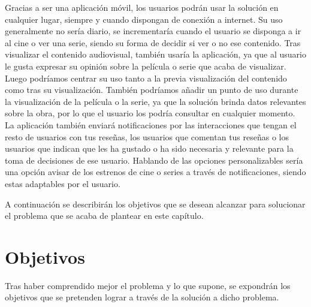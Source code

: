 Gracias a ser una aplicación móvil, los usuarios podrán usar la solución en cualquier lugar, siempre y 
cuando dispongan de conexión a internet. Su uso generalmente no sería diario, se incrementaría cuando 
el usuario se disponga a ir al cine o ver una serie, siendo su forma de decidir si ver o no ese 
contenido. Tras visualizar el contenido audiovisual, también usaría la aplicación, ya que al usuario le 
gusta expresar su opinión sobre la película o serie que acaba de visualizar. Luego podríamos centrar su 
uso tanto a la previa visualización del contenido como tras su visualización. También podríamos añadir 
un punto de uso durante la visualización de la película o la serie, ya que la solución brinda datos 
relevantes sobre la obra, por lo que el usuario los podría consultar en cualquier momento. La 
aplicación también enviará notificaciones por las interacciones que tengan el resto de usuarios con tus 
reseñas, los usuarios que comentan tus reseñas o los usuarios que indican que les ha gustado o ha sido 
necesaria y relevante para la toma de decisiones de ese usuario. Hablando de las opciones 
personalizables sería una opción avisar de los estrenos de cine o series a través de notificaciones, 
siendo estas adaptables por el usuario.

A continuación se describirán los objetivos que se desean alcanzar para solucionar el problema que se 
acaba de plantear en este capítulo.

\section{Objetivos}

Tras haber comprendido mejor el problema y lo que supone, se expondrán los objetivos que se pretenden 
lograr a través de la solución a dicho problema.

